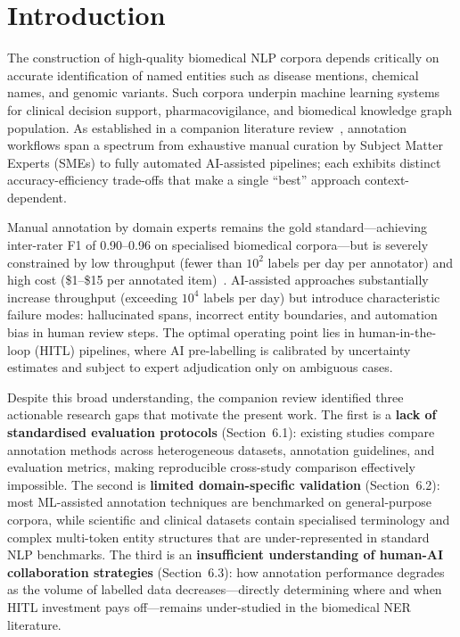 \documentclass[sigconf,nonacm]{acmart}
\begin{document}

\maketitle

\section{Introduction}

The construction of high-quality biomedical NLP corpora depends critically on accurate identification of named entities such as disease mentions, chemical names, and genomic variants. Such corpora underpin machine learning systems for clinical decision support, pharmacovigilance, and biomedical knowledge graph population. As established in a companion literature review~\cite{sutariya2026review}, annotation workflows span a spectrum from exhaustive manual curation by Subject Matter Experts (SMEs) to fully automated AI-assisted pipelines; each exhibits distinct accuracy-efficiency trade-offs that make a single ``best'' approach context-dependent.

Manual annotation by domain experts remains the gold standard---achieving inter-rater F1 of 0.90--0.96 on specialised biomedical corpora---but is severely constrained by low throughput (fewer than $10^2$ labels per day per annotator) and high cost (\$1--\$15 per annotated item)~\cite{sutariya2026review}. AI-assisted approaches substantially increase throughput (exceeding $10^4$ labels per day) but introduce characteristic failure modes: hallucinated spans, incorrect entity boundaries, and automation bias in human review steps. The optimal operating point lies in human-in-the-loop (HITL) pipelines, where AI pre-labelling is calibrated by uncertainty estimates and subject to expert adjudication only on ambiguous cases.

Despite this broad understanding, the companion review identified three actionable research gaps that motivate the present work. The first is a \textbf{lack of standardised evaluation protocols} (Section~6.1): existing studies compare annotation methods across heterogeneous datasets, annotation guidelines, and evaluation metrics, making reproducible cross-study comparison effectively impossible. The second is \textbf{limited domain-specific validation} (Section~6.2): most ML-assisted annotation techniques are benchmarked on general-purpose corpora, while scientific and clinical datasets contain specialised terminology and complex multi-token entity structures that are under-represented in standard NLP benchmarks. The third is an \textbf{insufficient understanding of human-AI collaboration strategies} (Section~6.3): how annotation performance degrades as the volume of labelled data decreases---directly determining where and when HITL investment pays off---remains under-studied in the biomedical NER literature.
\end{document}
